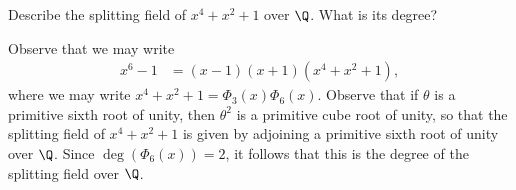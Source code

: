 \documentclass[10pt]{mypackage}
\begin{document}
\begin{problem}[Problem 8]
  Describe the splitting field of $x^{4} + x^2 + 1$ over $\Q$. What is its degree?
\end{problem}
\begin{solution}
  Observe that we may write
  \begin{align*}
    x^{6}-1 &= \left( x-1 \right)\left( x+1 \right)\left( x^{4} + x^2 + 1 \right),
  \end{align*}
  where we may write $x^{4} + x^2 + 1 = \Phi_3(x)\Phi_6(x)$. Observe that if $\theta$ is a primitive sixth root of unity, then $\theta^2$ is a primitive cube root of unity, so that the splitting field of $x^{4} + x^2 + 1$ is given by adjoining a primitive sixth root of unity over $\Q$. Since $\deg\left( \Phi_6(x) \right) = 2$, it follows that this is the degree of the splitting field over $\Q$.
\end{solution}
\end{document}
